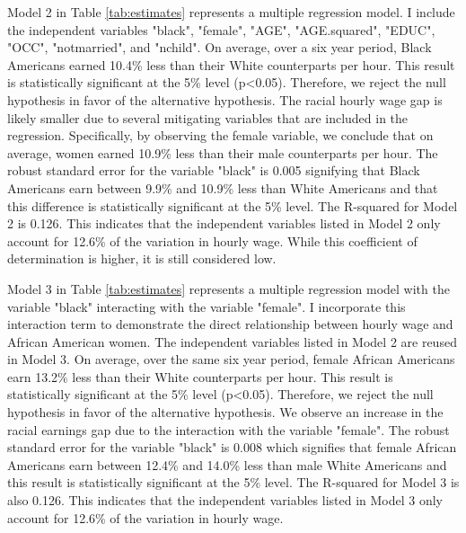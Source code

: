 \documentclass[12pt, english]{article}
\begin{document}
Model 2 in Table \ref{tab:estimates} represents a multiple regression model. I include the independent variables "black", "female", "AGE", "AGE.squared", "EDUC", "OCC", "notmarried", and "nchild". On average, over a six year period, Black Americans earned 10.4\% less than their White counterparts per hour. This result is statistically significant at the 5\% level (p\textless0.05). Therefore, we reject the null hypothesis in favor of the alternative hypothesis. The racial hourly wage gap is likely smaller due to several mitigating variables that are included in the regression. Specifically, by observing the female variable, we conclude that on average, women earned 10.9\% less than their male counterparts per hour. The robust standard error for the variable "black" is 0.005 signifying that Black Americans earn between 9.9\% and 10.9\% less than White Americans and that this difference is statistically significant at the 5\% level. The R-squared for Model 2 is 0.126. This indicates that the independent variables listed in Model 2 only account for 12.6\% of the variation in hourly wage. While this coefficient of determination is higher, it is still considered low.

Model 3 in Table \ref{tab:estimates} represents a multiple regression model with the variable "black" interacting with the variable "female". I incorporate this interaction term to demonstrate the direct relationship between hourly wage and African American women. The independent variables listed in Model 2 are reused in Model 3. On average, over the same six year period, female African Americans earn 13.2\% less than their White counterparts per hour. This result is statistically significant at the 5\% level (p\textless0.05). Therefore, we reject the null hypothesis in favor of the alternative hypothesis. We observe an increase in the racial earnings gap due to the interaction with the variable "female". The robust standard error for the variable "black" is 0.008 which signifies that female African Americans earn between 12.4\% and 14.0\% less than male White Americans and this result is statistically significant at the 5\% level. The R-squared for Model 3 is also 0.126. This indicates that the independent variables listed in Model 3 only account for 12.6\% of the variation in hourly wage.
\end{document}
